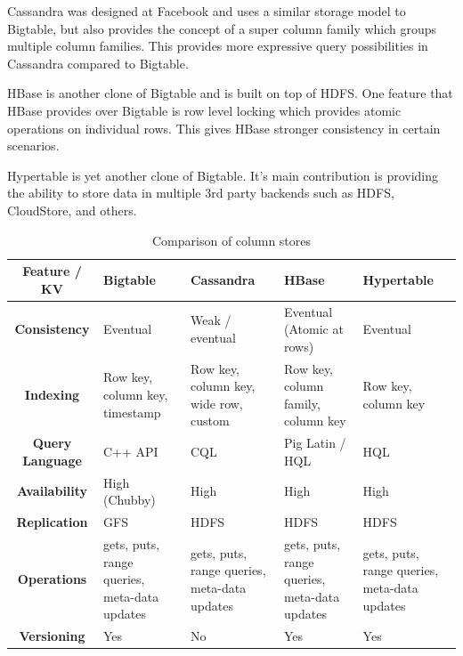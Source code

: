 \documentclass[]{article}
\begin{document}
Cassandra was designed at Facebook and uses a similar storage model to Bigtable, but also provides the concept of a super column family which groups multiple column families. This provides more expressive query possibilities in Cassandra compared to Bigtable.

HBase is another clone of Bigtable and is built on top of HDFS. One feature that HBase provides over Bigtable is row level locking which provides atomic operations on individual rows. This gives HBase stronger consistency in certain scenarios.

Hypertable is yet another clone of Bigtable. It's main contribution is providing the ability to store data in multiple 3rd party backends such as HDFS, CloudStore,  and others.

\begin{table}
    \begin{adjustbox}{center} 
        \begin{tabulary}{1.3\linewidth}{|c|L|L|L|L|}
            \hline 
            \textbf{Feature / KV} & \textbf{Bigtable} & \textbf{Cassandra} & \textbf{HBase} & \textbf{Hypertable} \\
            \hline 
            \textbf{Consistency} & Eventual & Weak / eventual & Eventual  (Atomic at rows) & Eventual \\ 
            \hline 
            \textbf{Indexing} & Row key, column key, timestamp & Row key, column key, wide row, custom & Row key, column family, column key & Row key, column key \\ 
            \hline 
            \textbf{Query Language} & C++ API & CQL & Pig Latin / HQL & HQL \\
            \hline 
            \textbf{Availability} & High (Chubby) & High & High & High \\ 
            \hline 
            \textbf{Replication} & GFS & HDFS & HDFS & HDFS \\ 
            \hline 
            \textbf{Operations} & gets, puts, range queries, meta-data updates & gets, puts, range queries, meta-data updates & gets, puts, range queries, meta-data updates & gets, puts, range queries, meta-data updates \\ 
            \hline 
            \textbf{Versioning} & Yes & No & Yes & Yes \\ 
            \hline 
        \end{tabulary} 
    \end{adjustbox}
    \caption{Comparison of column stores}
    \label{table:column-comparison}
\end{table}
\end{document}
